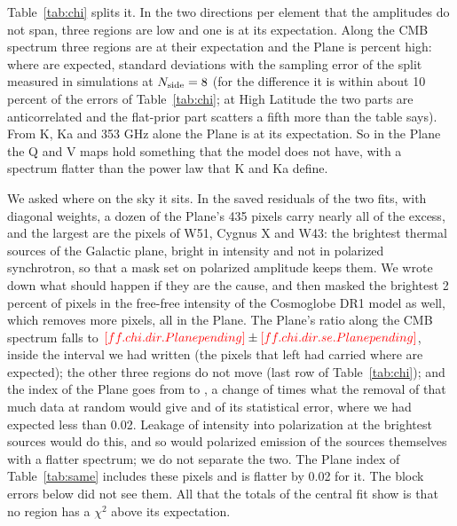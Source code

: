 Table~\ref{tab:chi} splits it. In the two directions per element that the amplitudes do not span,
three regions are low and one is at its expectation. Along the CMB spectrum three regions are at their
expectation and the Plane is  percent high:  where
 are expected,  standard deviations with the sampling
error of the split measured in  simulations at $N_{\rm side}=8$ (for the difference it is
within about 10 percent of the errors of Table~\ref{tab:chi}; at High Latitude the two parts are
anticorrelated and the flat-prior part scatters a fifth more than the table says).
From K, Ka and 353 GHz alone the Plane is at its
expectation. So in the Plane the Q and V maps hold something that the model does not have, with a
spectrum flatter than the power law that K and Ka define.

We asked where on the sky it sits. In the saved residuals of the two fits, with diagonal weights, a
dozen of the Plane's 435 pixels carry nearly all of the excess, and the largest are the pixels of
W51, Cygnus X and W43: the brightest thermal sources of the Galactic plane, bright in intensity and
not in polarized synchrotron, so that a mask set on polarized amplitude keeps them. We wrote down
what should happen if they are the cause, and then masked the brightest 2 percent of pixels in the
free-free intensity of the Cosmoglobe DR1 model as well, which removes  more pixels,
all in the Plane. The Plane's ratio along the CMB spectrum falls to
$\N{ff.chi.dir.Plane} \pm \N{ff.chi.dir.se.Plane}$, inside the interval we had written (the pixels
that left had carried  where  are expected); the other three regions do
not move (last row of Table~\ref{tab:chi}); and the index of the Plane goes from  to
, a change of  times what the removal of that much data at
random would give and  of its statistical error, where we had expected less than
0.02. Leakage of intensity into polarization at the brightest sources would do this, and so would
polarized emission of the sources themselves with a flatter spectrum; we do not separate the two.
The Plane index of Table~\ref{tab:same} includes these pixels and is flatter by 0.02 for it. The
block errors below did not see them. All that the totals of the central fit show is that no region
has a $\chi^2$ above its expectation.

